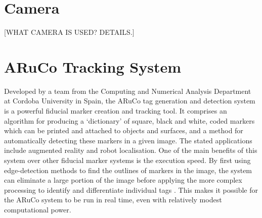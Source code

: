 
\section{Camera}
[WHAT CAMERA IS USED? DETAILS.]



\section{ARuCo Tracking System}
Developed by a team from the Computing and Numerical Analysis Department at Cordoba University in Spain, the ARuCo tag generation and detection system \cite{Garrido:2014} is a powerful fiducial marker creation and tracking tool. It comprises an algorithm for producing a `dictionary' of square, black and white, coded markers which can be printed and attached to objects and surfaces, and a method for automatically detecting these markers in a given image. The stated applications include augmented reality and robot localisation. One of the main benefits of this system over other fiducial marker systems is the execution speed. By first using edge-detection methods to find the outlines of markers in the image, the system can eliminate a large portion of the image before applying the more complex processing to identify and differentiate individual tags \cite{Garrido:2014}. This makes it possible for the ARuCo system to be run in real time, even with relatively modest computational power.

